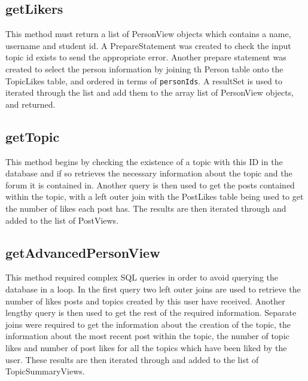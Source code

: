 \documentclass{article}
\begin{document}
\subsection*{getLikers}

This method must return a list of PersonView objects which contains a name, username and student id. A PrepareStatement was created to check the input topic id exists to send the appropriate error. Another prepare statement was created to select the person information by joining th Person table onto the TopicLikes table, and ordered in terms of \texttt{personIds}. A resultSet is used to iterated through the list and add them to the array list of PersonView objects, and returned.

\subsection*{getTopic}

This method begins by checking the existence of a topic with this ID in the database and if so retrieves the necessary information about the topic and the forum it is contained in. Another query is then used to get the posts contained within the topic, with a left outer join with the PostLikes table being used to get the number of likes each post has. The results are then iterated through and added to the list of PostViews.

\subsection*{getAdvancedPersonView}

This method required complex SQL queries in order to avoid querying the database in a loop. In the first query two left outer joins are used to retrieve the number of likes posts and topics created by this user have received. Another lengthy query is then used to get the rest of the required information. Separate joins were required to get the information about the creation of the topic, the information about the most recent post within the topic, the number of topic likes and number of post likes for all the topics which have been liked by the user. These results are then iterated through and added to the list of TopicSummaryViews.
\end{document}
